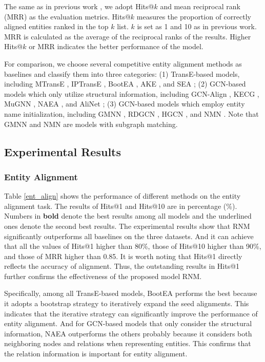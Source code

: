 \documentclass[letterpaper]{article} %
\begin{document}
The same as in previous work \cite{sun2018bootstrapping, yang2020cotsae}, 
we adopt Hits@$k$ and mean
reciprocal rank (MRR) as the evaluation metrics. Hits@$k$ measures
the proportion of correctly aligned entities ranked in the top $k$
list. $k$ is set as 1 and 10 as in previous work. MRR is calculated
as the average of the reciprocal ranks of the results. Higher
Hits@$k$ or MRR indicates the better performance of the model.

For comparison, we choose several competitive entity alignment
methods as baselines and classify them into three categories: (1)
TransE-based models, including MTransE \cite{chen2017multilingual},
IPTransE \cite{hao2017Iterative}, BootEA
\cite{sun2018bootstrapping}, AKE \cite{lin2019guiding}, 
and SEA \cite{pei2019semi}; (2) GCN-based
models which only utilize structural information, including GCN-Align \cite{wang2018cross}, KECG
\cite{li2019semi}, MuGNN \cite{cao2019multi}, NAEA
\cite{zhu2019neighborhood}, and AliNet \cite{sun2020knowledge}; 
(3) GCN-based models which employ entity name initialization,  
including GMNN \cite{xu2019cross}, RDGCN \cite{wu2019relation}, HGCN
\cite{wu2019jointly},  and NMN \cite{wu2020neighborhood}. 
Note that GMNN and NMN are models with subgraph matching.


\subsection{Experimental Results}

\subsubsection{Entity Alignment}

Table \ref{ent_align} shows the performance of different methods on
the entity alignment task. The results of Hits@1 and Hits@10 are in percentage (\%).
Numbers in \textbf{bold} denote the best
results among all models and the underlined ones denote the second
best results. The experimental results show that RNM significantly
outperforms all baselines on the three datasets. And it can achieve
that all the values of Hits@1 higher than 80\%, those of Hits@10
higher than 90\%, and those of MRR higher than 0.85. It is worth
noting that Hits@1 directly reflects the accuracy of alignment.
Thus, the outstanding results in Hits@1 further confirms the
effectiveness of the proposed model RNM.

Specifically, among all TransE-based models, BootEA performs the
best because it adopts a bootstrap strategy to iteratively
expand the seed alignments. This indicates that the iterative strategy can
significantly improve the performance of entity alignment. 
And for GCN-based models that only consider the structural information,
NAEA outperforms the others probably because it considers both neighboring
nodes and relations when representing entities. This confirms
that the relation information is important for entity alignment.
\end{document}
